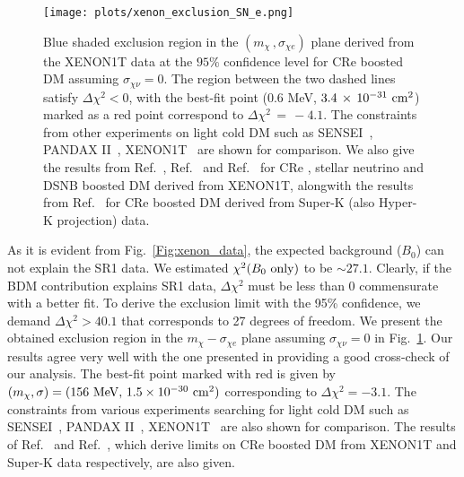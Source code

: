 \documentclass[11pt,prd,twocolumn,nofootinbib,reprint,superscriptaddress,longbibliography,colorlinks=true,citecolor=blue]{revtex4-1}
\begin{document}
\begin{figure}[h!]
\centering
\texttt{[image: plots/xenon\_exclusion\_SN\_e.png]}\hfill
\caption{Blue shaded exclusion region in the $(m_\chi\,,\sigma_{\chi e})$ plane derived from the XENON1T data at the $95\%$ confidence level for CRe boosted DM assuming $\sigma_{\chi \nu} = 0$. The region between the two dashed lines satisfy $\Delta \chi^2 < 0 $, with the best-fit point (0.6 MeV, $3.4\,\times\, 10^{-31}~\rm{cm^2}$) marked as a red point correspond to $\Delta \chi^2\,=\,-4.1 $. The constraints from other experiments on light cold DM such as SENSEI~\cite{SENSEI:2020dpa}, PANDAX II~\cite{PandaX-II:2021nsg}, XENON1T~\cite{XENON:2019gfn} are shown for comparison. We also give the results from  Ref.~\cite{Jho:2020sku}, Ref.~\cite{Jho:2021rmn} and Ref.~\cite{Das:2021lcr} for CRe , stellar neutrino and DSNB boosted DM derived from XENON1T, alongwith the results from Ref.~\cite{Cappiello:2019qsw} for CRe boosted DM derived from Super-K (also Hyper-K projection) data. 
}
\protect\label{Fig:chisqr_XENON1T_1}
\end{figure}

As it is evident from Fig.~\ref{Fig:xenon_data}, the expected background ($B_0$) can not explain the SR1 data. We estimated $\chi^2(B_0~\rm{only})$ to be $\sim 27.1$. Clearly,  if the BDM contribution explains SR1 data, $\Delta \chi^2$ must be less than $0$ commensurate with a better fit.   To derive the exclusion limit with the 95\% confidence, we demand $\Delta \chi^2 > 40.1$ that corresponds to 27 degrees of freedom. We present the obtained exclusion region in the  $m_\chi - \sigma_{\chi e}$ plane assuming $\sigma_{\chi \nu} = 0$ in Fig.~\ref{Fig:chisqr_XENON1T_1}. Our results agree very well with the one presented in \cite{Jho:2020sku} providing a good cross-check of our analysis. The best-fit point marked with red is given by $(m_\chi, \sigma)=(156~\rm{MeV}, \, 1.5\times 10^{-30}~\rm{cm^2})$ corresponding to $\Delta \chi^2 = -3.1 $. The constraints from various experiments searching for light cold DM such as SENSEI~\cite{SENSEI:2020dpa}, PANDAX II~\cite{PandaX-II:2021nsg}, XENON1T~\cite{XENON:2019gfn} are also shown for comparison. The results of Ref.~\cite{Jho:2020sku} and Ref.~\cite{Cappiello:2019qsw}, which derive limits on CRe boosted DM from XENON1T and Super-K data respectively, are also given. 
\end{document}
